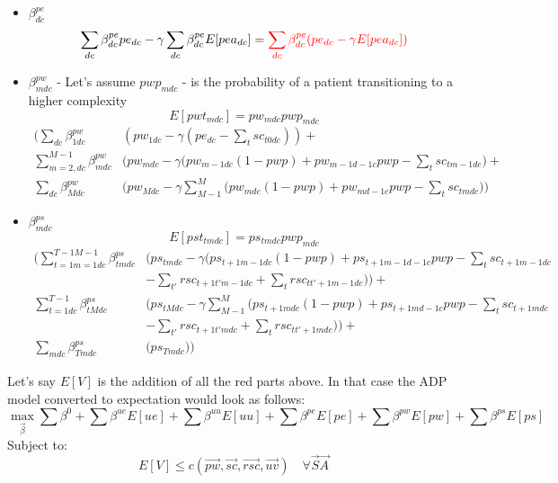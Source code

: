\documentclass{article}
\begin{document}
\begin{itemize}
	\item $\beta_{dc}^{pe}$
	\begin{equation*}
		\sum_{dc} \beta_{dc}^{pe} pe_{dc} - \gamma \sum_{dc} \beta_{dc}^{pe} E[pea_{dc}] = 
		\color{red} \sum_{dc} \beta_{dc}^{pe} (pe_{dc} - \gamma E[pea_{dc}])
	\end{equation*}	
	
	\item $\beta_{mdc}^{pw}$ - Let's assume $pwp_{mdc}$ - is the probability of a patient transitioning to a higher complexity
	\begin{equation*}
		E[pwt_{mdc}] = pw_{mdc} pwp_{mdc}		
	\end{equation*}
	{ \color{red} \begin{align*}
		\Bigg( \sum _{dc} \beta_{1dc}^{pw}& ( pw_{1dc} - \gamma (pe_{dc} - \sum_{t} sc_{t0dc})) + \\
		\sum_{m=2,dc}^{M-1} \beta_{mdc}^{pw} & ( pw_{mdc} - \gamma 
			\big( pw_{m-1dc} (1 - pwp) + pw_{m-1d-1c} pwp - \sum_{t} sc_{tm-1dc} \big) + \\
		\sum_{dc} \beta_{Mdc}^{pw} & ( pw_{Mdc} - \gamma \sum_{M-1}^{M}
			\big( pw_{mdc} (1 - pwp) + pw_{md-1c} pwp - \sum_{t} sc_{tmdc} \big) \Bigg)
	\end{align*} }

	\item $\beta_{mdc}^{ps}$
	\begin{equation*}
		E[pst_{tmdc}] = ps_{tmdc} pwp_{mdc}		
	\end{equation*}
	{ \color{red} \begin{align*}
		\Bigg( \sum _{t=1 m=1 dc}^{T-1 M-1} \beta_{tmdc}^{ps} & 
			\bigg( ps_{tmdc} - 
				\gamma \Big( ps_{t+1m-1dc}(1-pwp) + ps_{t+1m-1d-1c} pwp - \sum_{t} sc_{t+1m-1dc} \\ 
				&  - \sum_{t'} rsc_{t+1t'm-1dc} + \sum_{t} rsc_{tt'+1m-1dc} \Big) \bigg) + \\
		\sum _{t=1dc}^{T-1} \beta_{tMdc}^{ps} & 
			\bigg( ps_{tMdc} - 
				\gamma \sum_{M-1}^{M} \Big( ps_{t+1mdc}(1-pwp) + ps_{t+1md-1c} pwp - \sum_{t} sc_{t+1mdc} \\ 
				&  - \sum_{t'} rsc_{t+1t'mdc} + \sum_{t} rsc_{tt'+1mdc} \Big) \bigg) + \\ 
		\sum_{mdc} \beta_{Tmdc}^{ps} & 
			\bigg( ps_{Tmdc} \bigg) \Bigg)
	\end{align*} }
	
\end{itemize}

Let's say $E[V]$ is the addition of all the red parts above. In that case the ADP model converted to expectation would look as follows:
\begin{equation}
	\max_{\vec{\beta}} \sum \beta^{0} + \sum \beta^{ue} E[ue] + \sum \beta^{uu} E[uu] + 
		\sum \beta^{pe} E[pe] + \sum \beta^{pw} E[pw] + \sum \beta^{ps} E[ps]
\end{equation}
Subject to:
\begin{equation}
	E[V] \le c(\vec{pw}, \vec{sc}, \vec{rsc}, \vec{uv}) \quad \forall \vec{S} \vec{A} 
\end{equation}
\end{document}
